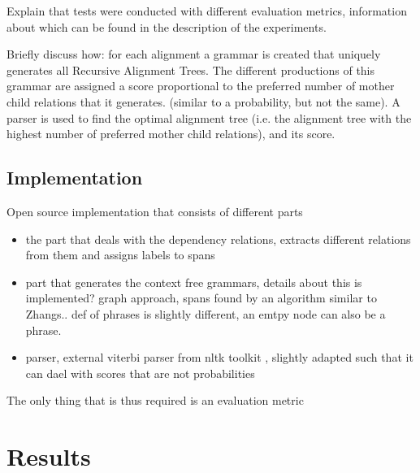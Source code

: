 \documentclass{report}
\theoremstyle{definition}
\theoremstyle{plain}
\begin{document}
Explain that tests were conducted with different evaluation metrics, information about which can be found in the description of the experiments.

Briefly discuss how: for each alignment a grammar is created that uniquely generates all Recursive Alignment Trees. The different productions of this grammar are assigned a score proportional to the preferred number of mother child relations that it generates. (similar to a probability, but not the same). A parser is used to find the optimal alignment tree (i.e. the alignment tree with the highest number of preferred mother child relations), and its score.


\section{Implementation}

Open source implementation that consists of different parts

\begin{itemize}
\item the part that deals with the dependency relations, extracts different relations from them and assigns labels to spans
\item part that generates the context free grammars, details about this is implemented? graph approach, spans found by an algorithm similar to Zhangs.. def of phrases is slightly different, an emtpy node can also be a phrase.
\item parser, external viterbi parser from nltk toolkit \citep{bird2009natural}, slightly adapted such that it can dael with scores that are not probabilities 
\end{itemize}

The only thing that is thus required is an evaluation metric


\chapter{Results}

\end{document}
